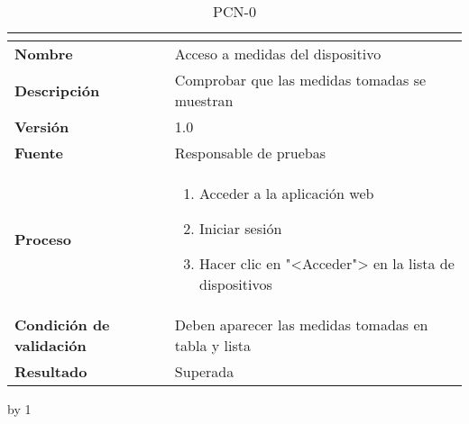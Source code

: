 \begin{table}[H]
	\caption{PCN-0\number\pcn}
	\begin{tabular}{|l|p{}|}
		\hline
		\multicolumn{2}{|c|}{\cellcolor[HTML]{BFBFBF}{\color[HTML]{000000} \textbf{PCN-0\number\pcn}}} \\ \hline
		\textbf{Nombre}                  & Acceso a medidas del dispositivo                    \\ \hline
		\textbf{Descripción}             & Comprobar que las medidas tomadas se muestran       \\ \hline
		\textbf{Versión}                 & 1.0                                                 \\ \hline
		\textbf{Fuente}                  & Responsable de pruebas                              \\ \hline
		\textbf{Proceso}                 & \begin{enumerate}
			\item Acceder a la aplicación web
			\item Iniciar sesión
			\item Hacer clic en "<Acceder"> en la lista de dispositivos
		\end{enumerate}                          \\ \hline
		\textbf{Condición de validación} & Deben aparecer las medidas tomadas en tabla y lista \\ \hline
		\textbf{Resultado}               & Superada                                            \\ \hline
	\end{tabular}
\end{table}
\advance\pcn by 1
